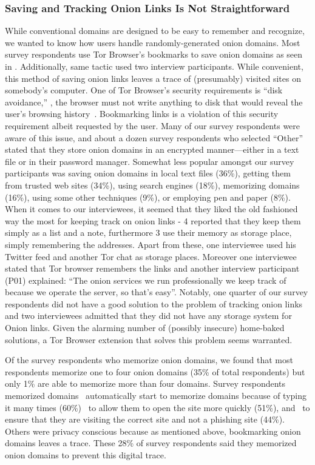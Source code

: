\subsubsection{Saving and Tracking Onion Links Is Not Straightforward}
While conventional domains are designed to be easy to remember and recognize, we wanted to know how users handle randomly-generated onion domains. Most survey respondents use Tor Browser's bookmarks to save onion domains as seen in . Additionally, same tactic used two interview participants.   While
convenient, this method of saving onion links leaves a trace of (presumably) visited sites on somebody's
computer.  One of Tor Browser's security requirements is ``disk avoidance,''
\ie, the browser must not write anything to disk that would reveal the user's
browsing history~\cite[\S~2.1]{Perry2017a}.  Bookmarking links is a violation of
this security requirement albeit requested by the user.  Many of our survey respondents
were aware of this issue, and about a dozen survey respondents who selected ``Other'' stated that they store onion domains in an encrypted manner---either in a text file or in their password manager.  Somewhat less popular amongst our survey participants was saving onion domains in local text files (36\%), getting them from trusted web sites (34\%), using search engines (18\%), memorizing domains (16\%), using some other 
techniques (9\%), or employing pen and paper (8\%).  When it comes to our interviewees, it seemed that they liked the old fashioned way the most for keeping track on onion links  - 4 reported that they keep them simply as a list and a note, furthermore 3 use their memory as storage place, simply remembering the addresses. Apart from these, one interviewee used his Twitter feed and another Tor chat as storage places. Moreover one interviewee stated that Tor browser remembers the links and another interview participant (P01) explained: “The onion services we run professionally we keep track of because we operate the server, so that's easy”. Notably, one quarter of our survey
respondents did not have a good solution to the problem of tracking onion links and  two interviewees admitted that they did not have any storage system for Onion links.
Given the alarming
number of (possibly insecure) home-baked solutions, a Tor Browser extension that
solves this problem seems warranted.

Of the survey respondents who memorize onion domains, we found that most respondents
memorize one to four onion domains (35\% of total respondents) but only 1\% are able to memorize more than four domains.   Survey respondents memorized domains \first~automatically start to memorize domains
because of typing it many times (60\%)
\second~to allow them to open the site more
quickly (51\%), and \third~to ensure that they are visiting the correct site and
not a phishing site (44\%). Others were privacy conscious because as mentioned above,
bookmarking onion domains leaves a trace. These 28\% of survey respondents said
they memorized onion domains to prevent this digital trace.

